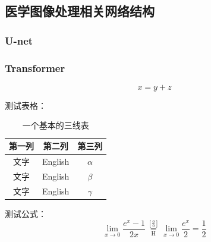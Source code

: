 \subsection{医学图像处理相关网络结构}

\subsubsection{U-net}

    

\subsubsection{Transformer}





\begin{equation}
    x = y+z
\end{equation}



测试表格：
\begin{table}[!htbp]
    \centering
    \caption{一个基本的三线表}
    \begin{tabular*}{350pt}{@{\extracolsep{\fill}}ccc}
        \toprule
        第一列 & 第二列     & 第三列      \\
        \midrule
        文字  & English & $\alpha$ \\
        文字  & English & $\beta$  \\
        文字  & English & $\gamma$ \\
        \bottomrule
    \end{tabular*}
\end{table}

测试公式：
\begin{equation}
    \lim_{x\to 0}{\frac{e^x-1}{2x}}
    \overset{\left[\frac{0}{0}\right]}{\underset{\mathrm{H}}{=}}
    \lim_{x\to 0}{\frac{e^x}{2}}={\frac{1}{2}}
\end{equation}
\newpage